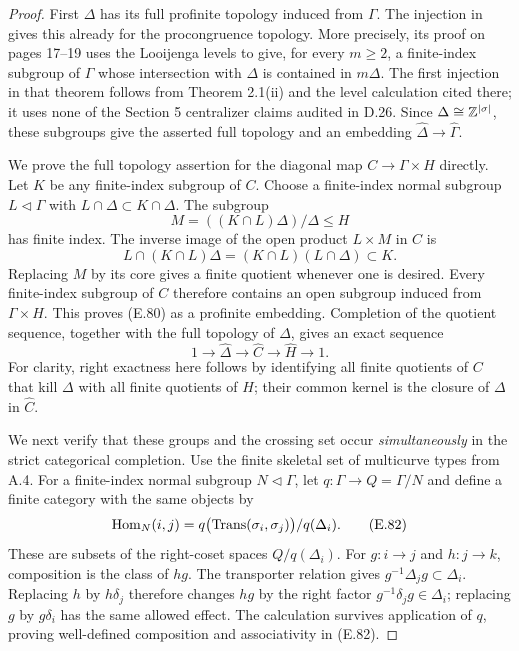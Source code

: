 \begin{proof}
First $\Delta$ has its full profinite topology induced from
$\Gamma$.  The injection in \cite[Theorem 4.5]{ET_Boggi2014}
gives this already for the procongruence topology.  More precisely,
its proof on pages 17--19 uses the Looijenga levels to give, for
every $m\geq2$, a finite-index subgroup of $\Gamma$ whose
intersection with $\Delta$ is contained in $m\Delta$.
The first injection in that theorem follows from Theorem 2.1(ii)
and the level calculation cited there; it uses none of the
Section 5 centralizer claims audited in D.26.  Since
$\Delta\cong\mathbb Z^{|\sigma|}$, these subgroups give the asserted
full topology and an embedding $\widehat\Delta\to\widehat\Gamma$.

We prove the full topology assertion for the diagonal map
$C\to\Gamma\times H$ directly.  Let $K$ be any finite-index
subgroup of $C$.  Choose a finite-index normal subgroup
$L\triangleleft\Gamma$ with
$L\cap\Delta\subset K\cap\Delta$.  The subgroup
\[
 M=((K\cap L)\Delta)/\Delta\leq H
\]
has finite index.  The inverse image of the open product
$L\times M$ in $C$ is
\[
 L\cap(K\cap L)\Delta
       =(K\cap L)(L\cap\Delta)\subset K.
\]
Replacing $M$ by its core gives a finite quotient whenever one
is desired.  Every finite-index subgroup of $C$ therefore
contains an open subgroup induced from $\Gamma\times H$.
This proves (E.80) as a profinite embedding.  Completion of the
quotient sequence, together with the full topology of $\Delta$,
gives an exact sequence
\[
 1\longrightarrow\widehat\Delta\longrightarrow\widehat C
       \longrightarrow\widehat H\longrightarrow1.             \tag{E.81}
\]
For clarity, right exactness here follows by identifying all
finite quotients of $C$ that kill $\Delta$ with all finite
quotients of $H$; their common kernel is the closure of
$\Delta$ in $\widehat C$.

We next verify that these groups and the crossing set occur
\emph{simultaneously} in the strict categorical completion.
Use the finite skeletal set of multicurve types from A.4.
For a finite-index normal subgroup $N\triangleleft\Gamma$, let
$q:\Gamma\to Q=\Gamma/N$ and define a finite category with
the same objects by
\[
 \operatorname{Hom}_N(i,j)=q\bigl(\operatorname{Trans}(\sigma_i,\sigma_j)\bigr)
                         /q(\Delta_i).
                                                               \tag{E.82}
\]
These are subsets of the right-coset spaces $Q/q(\Delta_i)$.
For $g:i\to j$ and $h:j\to k$, composition is the class
of $hg$.  The transporter relation gives
$g^{-1}\Delta_jg\subset\Delta_i$.  Replacing $h$ by
$h\delta_j$ therefore changes $hg$ by the right factor
$g^{-1}\delta_jg\in\Delta_i$; replacing $g$ by
$g\delta_i$ has the same allowed effect.  The calculation
survives application of $q$, proving well-defined composition
and associativity in (E.82).


\end{proof}
